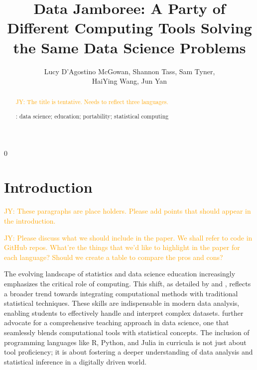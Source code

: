 \documentclass[12pt, letterpaper]{article}
\newcommand{\jy}[1]{\textcolor{orange}{JY: #1}}
\newcommand{\blind}{0}
\begin{document}

\title{\bf Data Jamboree: A Party of Different Computing Tools Solving the
  Same Data Science Problems}
\blind
{
  \author{Lucy D'Agostino McGowan,
    Shannon Tass,
    Sam Tyner,\\
    HaiYing Wang,
    Jun Yan
  }
} \fi

\maketitle

\doublespace

\begin{abstract}

  \jy{The title is tentative. Needs to reflect three languages.}


\bigskip
{}:
data science;
education;
portability;
statistical computing
\end{abstract}


\section{Introduction}
\label{sec:intro}


\jy{These paragraphs are place holders. Please add points that should appear in
  the introduction.}

\jy{Please discuss what we should include in the paper. We shall refer to code
  in GitHub repos. What're the things that we'd like to highlight in the paper
  for each language? Should we create a table to compare the pros and cons?}

The evolving landscape of statistics and data science education increasingly
emphasizes the critical role of computing. This shift, as detailed by
\citet{hardin2021computing} and \citet{nolan2010computing}, reflects a broader
trend towards integrating computational methods with traditional statistical
techniques. These skills are indispensable in modern data analysis, enabling
students to effectively handle and interpret complex
datasets. \citet{hicks2018guide} further advocate for a comprehensive teaching
approach in data science, one that seamlessly blends computational tools with
statistical concepts. The inclusion of programming languages like R, Python, and
Julia in curricula is not just about tool proficiency; it is about fostering a
deeper understanding of data analysis and statistical inference in a digitally
driven world.
\end{document}
